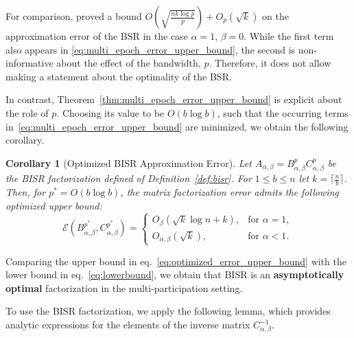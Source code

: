 \documentclass{article} %
\newtheorem{corollary}{Corollary}
\newcommand{\acronym}{BISR\xspace}
\begin{document}
For comparison, \citet{kalinin2024} proved a bound 
$O\left(\sqrt{\frac{nk \log p}{p}}\right) + O_{p}(\sqrt{k})$ on the 
approximation error of the BSR in the case $\alpha=1$, $\beta=0$.
%
While the first term also appears in \eqref{eq:multi_epoch_error_upper_bound}, the second is non-informative about the effect of the bandwidth, $p$.  Therefore, it does not allow making a statement about the optimality of the BSR.

In contrast, Theorem~\ref{thm:multi_epoch_error_upper_bound} is explicit about
the role of $p$. Choosing its value to be $O(b\log b)$, such that the occurring terms in~\eqref{eq:multi_epoch_error_upper_bound}
are  minimized, we obtain the following corollary.

\begin{corollary}[Optimized \acronym Approximation Error]
\label{cor:optimized_error_upper_bound}
Let $A_{\alpha, \beta} = B_{\alpha, \beta}^p C_{\alpha, \beta}^p$ be the BISR factorization defined of Definition~\ref{def:bisr}.
For $1 \le b \le n$ let $k = \lceil\frac{n}{b}\rceil$. Then, for $p^* =O( b \log b)$, the matrix factorization error 
admits the following optimized upper bound: 
\begin{equation}
\mathcal{E}(B_{\alpha, \beta}^{p^*}, C_{\alpha, \beta}^{p^*}) = 
\begin{cases}
 O_{\beta}\left(\sqrt{k} \log n + k\right), & \text{for } \alpha = 1,\\
O_{\alpha, \beta}(\sqrt{k}), & \text{for } \alpha < 1.
\end{cases}\label{eq:optimized_error_upper_bound}
\end{equation}
\end{corollary}
Comparing the upper bound in eq.~\eqref{eq:optimized_error_upper_bound} with the lower bound in eq.~\eqref{eq:lowerbound}, we obtain that BISR is an \textbf{asymptotically optimal} factorization in the multi-participation setting.


To use the BISR factorization, we apply the following lemma, which provides analytic expressions for the elements of the inverse matrix $C_{\alpha, \beta}^{-1}$.
\end{document}
